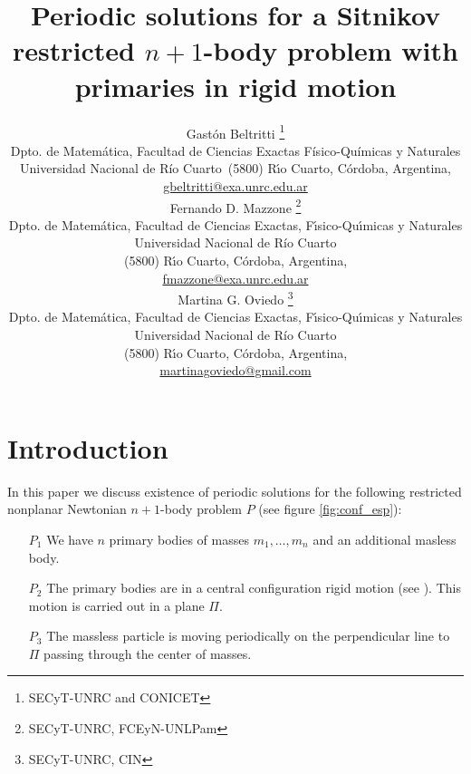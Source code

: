 \documentclass[twoside]{article}
\title{Periodic solutions for a Sitnikov restricted $n+1$-body problem with primaries in rigid motion}
\author{Gast\'on Beltritti \thanks{SECyT-UNRC and CONICET}\\
Dpto. de Matem\'atica, Facultad de Ciencias Exactas Físico-Químicas y Naturales\\
Universidad Nacional de R\'{i}o Cuarto\
(5800) R\'{\i}o Cuarto, C\'ordoba, Argentina,\\
\url{gbeltritti@exa.unrc.edu.ar}\\[3mm]
Fernando D. Mazzone \thanks{SECyT-UNRC, FCEyN-UNLPam}\\
Dpto. de Matem\'atica, Facultad de Ciencias Exactas, F\'{\i}sico-Qu\'{\i}micas y Naturales\\
Universidad Nacional de R\'{i}o Cuarto\\
(5800) R\'{\i}o Cuarto, C\'ordoba, Argentina,\\
\url{fmazzone@exa.unrc.edu.ar}\\
Martina G. Oviedo \thanks{SECyT-UNRC, CIN}\\
Dpto. de Matem\'atica, Facultad de Ciencias Exactas, F\'{\i}sico-Qu\'{\i}micas y Naturales\\
Universidad Nacional de R\'{i}o Cuarto\\
(5800) R\'{\i}o Cuarto, C\'ordoba, Argentina,\\
\url{martinagoviedo@gmail.com}
}
\date{}
\theoremstyle{remark}
\begin{document}
\maketitle
%
%
%
%
%

\begin{abstract}


\end{abstract}




\pagestyle{fancy} \headheight 35pt \fancyhead{} \fancyfoot{}

\fancyfoot[C]{\thepage}  \fancyhead[CO]{\nouppercase{\section}}

\fancyhead[CO]{\nouppercase{\leftmark}}






\section{Introduction}
In this paper we discuss existence of periodic solutions for the following restricted nonplanar Newtonian $n+1$-body problem $P$ (see figure \ref{fig:conf_esp}):
\begin{itemize}
 \item[$P_1$] We have $n$ primary bodies of masses $m_1,\ldots,m_n$ and an additional masless body.
 \item[$P_2$] The primary bodies are in a central  configuration rigid motion (see \cite[Section 2.9]{JaumeLlibre276}). This motion is carried out in a plane $\Pi$.
 \item[$P_3$] The massless particle is moving periodically on the perpendicular line to $\Pi$ passing through the center of masses.
\end{itemize}
\end{document}
